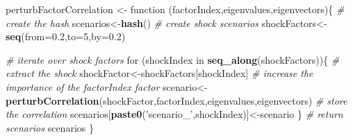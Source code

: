 \documentclass[]{article}
\newenvironment{Shaded}{\begin{snugshade}}{\end{snugshade}}
\newcommand{\KeywordTok}[1]{\textcolor[rgb]{0.13,0.29,0.53}{\textbf{{#1}}}}
\newcommand{\DataTypeTok}[1]{\textcolor[rgb]{0.13,0.29,0.53}{{#1}}}
\newcommand{\DecValTok}[1]{\textcolor[rgb]{0.00,0.00,0.81}{{#1}}}
\newcommand{\FloatTok}[1]{\textcolor[rgb]{0.00,0.00,0.81}{{#1}}}
\newcommand{\StringTok}[1]{\textcolor[rgb]{0.31,0.60,0.02}{{#1}}}
\newcommand{\CommentTok}[1]{\textcolor[rgb]{0.56,0.35,0.01}{\textit{{#1}}}}
\newcommand{\NormalTok}[1]{{#1}}
\begin{document}
\begin{Shaded}
\begin{Highlighting}[]
\NormalTok{perturbFactorCorrelation <-}\StringTok{ }\NormalTok{function (factorIndex,eigenvalues,eigenvectors)\{}
  \CommentTok{# create the hash}
  \NormalTok{scenarios<-}\KeywordTok{hash}\NormalTok{()}
  \CommentTok{# create shock scenarios}
  \NormalTok{shockFactors<-}\KeywordTok{seq}\NormalTok{(}\DataTypeTok{from=}\FloatTok{0.2}\NormalTok{,}\DataTypeTok{to=}\DecValTok{5}\NormalTok{,}\DataTypeTok{by=}\FloatTok{0.2}\NormalTok{)}

  \CommentTok{# iterate over shock factors}
  \NormalTok{for (shockIndex in }\KeywordTok{seq_along}\NormalTok{(shockFactors))\{}
    \CommentTok{# extract the shock}
    \NormalTok{shockFactor<-shockFactors[shockIndex]}
    \CommentTok{# increase the importance of the factorIndex factor}
    \NormalTok{scenario<-}\KeywordTok{perturbCorrelation}\NormalTok{(shockFactor,factorIndex,eigenvalues,eigenvectors)}
    \CommentTok{# store the correlation}
    \NormalTok{scenarios[}\KeywordTok{paste0}\NormalTok{(}\StringTok{'scenario_'}\NormalTok{,shockIndex)]<-scenario}
  \NormalTok{\}}
  \CommentTok{# return scenarios}
  \NormalTok{scenarios}
\NormalTok{\}}
\end{Highlighting}
\end{Shaded}
\end{document}
